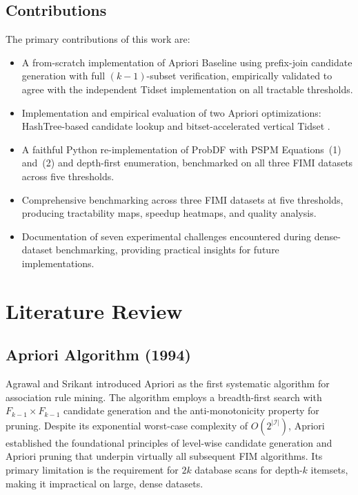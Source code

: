 \documentclass[conference]{IEEEtran}
\begin{document}
\subsection*{Contributions}
The primary contributions of this work are:
\begin{itemize}
  \item A from-scratch implementation of Apriori Baseline using
    prefix-join candidate generation with full $(k-1)$-subset
    verification, empirically validated to agree with the independent
    Tidset implementation on all tractable thresholds.
  \item Implementation and empirical evaluation of two Apriori
    optimizations: HashTree-based candidate lookup \cite{park1995}
    and bitset-accelerated vertical Tidset \cite{zaki1997}.
  \item A faithful Python re-implementation of ProbDF \cite{probdf2024}
    with PSPM Equations~(1) and~(2) and depth-first enumeration,
    benchmarked on all three FIMI datasets across five thresholds.
  \item Comprehensive benchmarking across three FIMI datasets at five
    thresholds, producing tractability maps, speedup heatmaps, and
    quality analysis.
  \item Documentation of seven experimental challenges encountered
    during dense-dataset benchmarking, providing practical insights
    for future implementations.
\end{itemize}

\section{Literature Review}

\subsection{Apriori Algorithm (1994)}
Agrawal and Srikant \cite{agrawal1994} introduced Apriori as the first
systematic algorithm for association rule mining. The algorithm employs
a breadth-first search with $F_{k-1} \times F_{k-1}$ candidate
generation and the anti-monotonicity property for pruning. Despite its
exponential worst-case complexity of $O(2^{|\mathcal{I}|})$, Apriori
established the foundational principles of level-wise candidate
generation and Apriori pruning that underpin virtually all subsequent FIM
algorithms. Its primary limitation is the requirement for $2k$ database
scans for depth-$k$ itemsets, making it impractical on large, dense
datasets.
\end{document}
